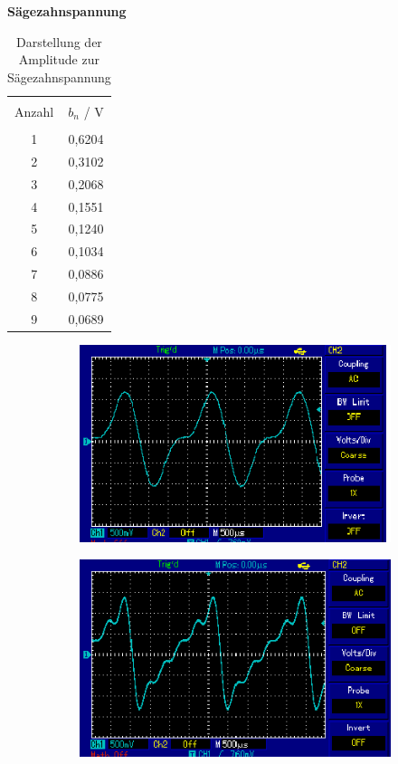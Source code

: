\centerline{\textbf{Sägezahnspannung}}
\begin{table}[H]
  \centering
  \begin{tabular}{c c}
    \toprule\\
    Anzahl & $b_n$ / V \\
    \midrule \\
    1 & 0,6204 \\
    2 & 0,3102 \\
    3 & 0,2068 \\
    4 & 0,1551 \\
    5 & 0,1240 \\
    6 & 0,1034 \\
    7 & 0,0886 \\
    8 & 0,0775 \\
    9 & 0,0689 \\
    \bottomrule
  \end{tabular}
  \caption{Darstellung der Amplitude zur Sägezahnspannung}
  \label{tab:6}
\end{table}
\begin{figure}[H]
  \centering
  \begin{subfigure}{0.48\textwidth}
	\includegraphics[width=\textwidth]{Saegespannung/1.png}
\end{subfigure}
\begin{subfigure}{0.48\textwidth}
  \includegraphics[width=\textwidth]{Saegespannung/4.png}
\end{subfigure}
\end{figure}
